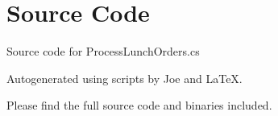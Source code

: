 \documentclass[12pt]{article}
\begin{document}
\maketitle
\pagebreak


\section{Source Code}

Source code for \textsf{ProcessLunchOrders.cs}


\newpage



\newpage

Autogenerated using scripts by Joe and \LaTeX.

Please find the full source code and binaries included.
\end{document}
